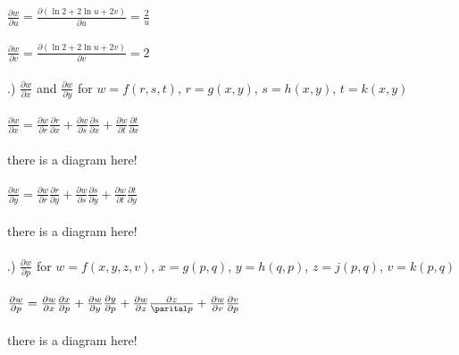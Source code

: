 \documentclass[12pt]{article}
\begin{document}
\noindent $\frac{\partial w}{\partial u} = \frac{\partial (\ln{2} + 2\ln{u} + 2v)}{\partial u} = \frac{2}{u}$\\\\

\noindent $\frac{\partial w}{\partial v} = \frac{\partial (\ln{2} + 2\ln{u} + 2v)}{\partial v} = 2$\\\\


.) $\frac{\partial w}{\partial x}$ and $\frac{\partial w}{\partial y}$ for $w = f(r,s,t)$, \hspace{10pt} $r = g(x,y)$, \hspace{10pt} $s = h(x,y)$, \hspace{10pt} $t = k(x,y)$\\\\

\noindent $\frac{\partial w}{\partial x} = \frac{\partial w}{\partial r}\frac{\partial r}{\partial x} + \frac{\partial w}{\partial s}\frac{\partial s}{\partial x} + \frac{\partial w}{\partial t}\frac{\partial t}{\partial x}$ \\\\
there is a diagram here!\vspace{6cm}\\\\

\noindent $\frac{\partial w}{\partial y} = \frac{\partial w}{\partial r}\frac{\partial r}{\partial y} + \frac{\partial w}{\partial s}\frac{\partial s}{\partial y} + \frac{\partial w}{\partial t}\frac{\partial t}{\partial y}$ \\\\
there is a diagram here!\vspace{6cm}\\\\



.) $\frac{\partial w}{\partial p}$ for $w = f(x,y,z,v)$, \hspace{10pt} $x = g(p,q)$, \hspace{10pt} $y = h(q,p)$, \hspace{10pt} $z = j(p,q)$, \hspace{10pt} $v = k(p,q)$\\\\
\noindent $\frac{\partial w}{\partial p} = \frac{\partial w}{\partial x}\frac{\partial x}{\partial p} + \frac{\partial w}{\partial y}\frac{\partial y}{\partial p} + \frac{\partial w}{\partial z}\frac{\partial z}{\parital p} + \frac{\partial w}{\partial v}\frac{\partial v}{\partial p}$\\\\
there is a diagram here!\vspace{10pt}\\\\
\end{document}

